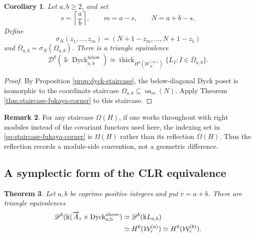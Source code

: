 \documentclass[12pt,a4paper,english,reqno]{amsart}
\theoremstyle{plain}
\newtheorem{theorem}{Theorem}[section]
\newtheorem{corollary}[theorem]{Corollary}
\theoremstyle{definition}
\newtheorem{remark}[theorem]{Remark}
\newcommand{\kk}{\Bbbk}
\newcommand{\thick}{\operatorname{thick}}
\newcommand{\Dyck}{\operatorname{Dyck}}
\newcommand{\os}{\operatorname{os}}
\newcommand{\Wcat}{\mathcal W}
\newcommand{\Db}[1]{{\mathscr D}^b(#1)}
\newcommand{\ovr}{\rm \overrightarrow}
\begin{document}
\begin{corollary}
\label{thm:dyck-fukaya-corner}
Let $a,b\geq2$, and set
\begin{equation}
 s=\left\lceil\frac ab\right\rceil,\qquad
 m=a-s,\qquad N=a+b-s,
\label{eq:fukaya-local-indices}
\end{equation}
Define
\begin{equation}
 \sigma_N(z_1,\ldots,z_m)
 =
 (N+1-z_m,\ldots,N+1-z_1)
\label{eq:sigma-local}
\end{equation}
and $\overline\Omega_{a,b}=\sigma_N(\Omega_{a,b})$.  There is a triangle
equivalence
\begin{equation}
 \Db{\kk\Dyck^{\mathrm{below}}_{a,b}}
 \simeq
 \thick_{H^0(\Wcat_N^{(m)})}
 \{L_I:I\in\overline\Omega_{a,b}\}.
\label{eq:dyck-fukaya-corner}
\end{equation}
\end{corollary}

\begin{proof}
By Proposition \ref{prop:dyck-staircase}, the below-diagonal Dyck poset is
isomorphic to the coordinate staircase $\Omega_{a,b}\subseteq\os_m(N)$.
Apply Theorem \ref{thm:staircase-fukaya-corner} to this staircase.
\end{proof}

\begin{remark}
\label{rem:corner-convention}
For any staircase $\Omega(H)$, if one works throughout with right modules
instead of the covariant functors used here, the indexing set in
\eqref{eq:staircase-fukaya-corner} is $\Omega(H)$ rather than its reflection
$\overline\Omega(H)$.  Thus the reflection records a module-side convention,
not a geometric difference.
\end{remark}

\subsection{A symplectic form of the CLR equivalence}

\begin{theorem}
\label{thm:symplectic-CLR}
Let $a,b$ be coprime positive integers and put $r=a+b$.  There are
triangle equivalences
\begin{equation}
\begin{split}
 \Db{\kk(\ovr A_r\times\Dyck^{\mathrm{above}}_{a,b}}
 &\simeq\Db{\kk L_{a,b}}\\
 &\simeq H^0(\Wcat_r^{(a)})
 \simeq H^0(\Wcat_r^{(b)}).
\end{split}
\label{eq:symplectic-CLR}
\end{equation}
\end{theorem}
\end{document}
